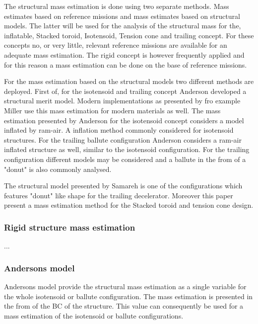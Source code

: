 The structural mass estimation is done using two separate methods. Mass estimates based on reference missions and mass estimates based on structural models. The latter will be used for the analysis of the structural mass for the, inflatable, Stacked toroid, Isotensoid, Tension cone and trailing concept. For these concepts no, or very little, relevant reference missions are available for an adequate mass estimation. The rigid concept is however frequently applied and for this reason a mass estimation can be done on the base of reference missions.

For the mass estimation based on the structural models two different methods are deployed. First of, for the isotensoid and trailing concept Anderson \cite{Anderson1969} developed a structural merit model. Modern implementations as presented by fro example Miller \cite{Miller2014} use this mass estimation for modern materials as well. The mass estimation presented by Anderson for the isotensoid concept considers a model inflated by ram-air. A inflation method commonly considered for isotensoid structures\cite{Smith2011}. For the trailing ballute configuration Anderson considers a ram-air inflated structure as well, similar to the isotensoid configuration. For the trailing configuration different models may be considered and a ballute in the from of a "donut" is also commonly analysed. 

The structural model presented by Samareh\cite{Samareh2011} is one of the configurations which features "donut" like shape for the trailing decelerator. Moreover this paper present a mass estimation method for the Stacked toroid and tension cone design.

\subsubsection{Rigid structure mass estimation}

...

\subsubsection{Andersons model}
Andersons model provide the structural mass estimation as a single variable for the whole isotensoid or ballute configuration. The mass estimation is presented in the from of the \gls{BC} of the structure. This value can consequently be used for a mass estimation of the isotensoid or ballute configurations.

